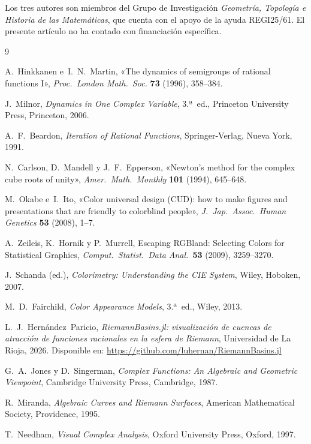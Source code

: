 \documentclass[11pt,a4paper]{article}
\theoremstyle{plain}
\theoremstyle{definition}
\theoremstyle{remark}
\begin{document}
Los tres autores son miembros del Grupo de Investigación
\emph{Geometría, Topología e Historia de las Matemáticas},
que cuenta con el apoyo de la ayuda REGI25/61.
El presente artículo no ha contado con financiación específica.

\begin{thebibliography}{9}

A.~Hinkkanen e~I.~N.~Martin,
«The dynamics of semigroups of rational functions I»,
\textit{Proc.\ London Math.\ Soc.} \textbf{73} (1996), 358--384.

J.~Milnor,
\textit{Dynamics in One Complex Variable},
3.ª~ed., Princeton University Press, Princeton, 2006.

A.~F.~Beardon,
\textit{Iteration of Rational Functions},
Springer-Verlag, Nueva York, 1991.

N.~Carlson, D.~Mandell y J.~F.~Epperson,
«Newton's method for the complex cube roots of unity»,
\textit{Amer.\ Math.\ Monthly} \textbf{101} (1994), 645--648.

M.~Okabe e~I.~Ito,
«Color universal design (CUD): how to make figures and presentations
that are friendly to colorblind people»,
\textit{J.\ Jap.\ Assoc.\ Human Genetics} \textbf{53} (2008), 1--7.

A.~Zeileis, K.~Hornik y P.~Murrell,
\guillemotleft Escaping RGBland: Selecting Colors for Statistical
Graphics\guillemotright,
\textit{Comput.\ Statist.\ Data Anal.}\ \textbf{53} (2009),
3259--3270.

J.~Schanda (ed.),
\textit{Colorimetry: Understanding the CIE System},
Wiley, Hoboken, 2007.

M.~D.~Fairchild,
\textit{Color Appearance Models},
3.ª~ed., Wiley, 2013.

L.~J.~Hernández~Paricio,
\textit{RiemannBasins.jl: visualización de cuencas de atracción de
funciones racionales en la esfera de Riemann},
Universidad de La Rioja, 2026.
Disponible en: \url{https://github.com/luhernan/RiemannBasins.jl}


G.~A.~Jones y D.~Singerman,
\textit{Complex Functions: An Algebraic and Geometric Viewpoint},
Cambridge University Press, Cambridge, 1987.

R.~Miranda,
\textit{Algebraic Curves and Riemann Surfaces},
American Mathematical Society, Providence, 1995.

T.~Needham,
\textit{Visual Complex Analysis},
Oxford University Press, Oxford, 1997.

\end{thebibliography}
\end{document}
